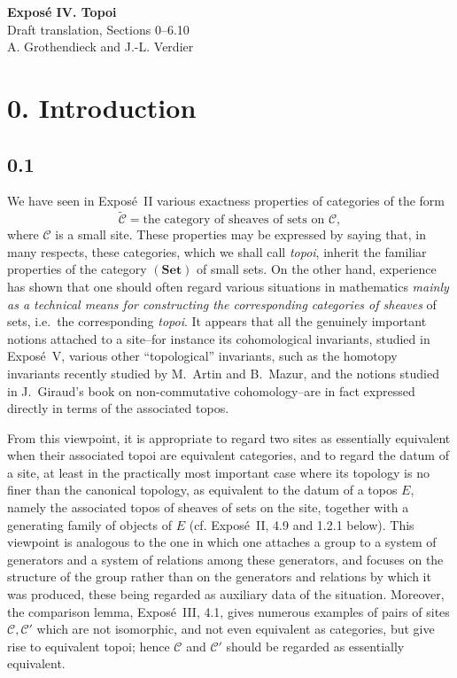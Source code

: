 \documentclass[11pt]{article}
\newcommand{\C}{\mathcal{C}}
\newcommand{\Set}{\mathbf{Set}}
\newcommand{\ie}{i.e.}
\begin{document}
\begin{center}
{\Large \textbf{Expos\'e IV. Topoi}}\\[0.35em]
{\large Draft translation, Sections 0--6.10}\\[0.35em]
A. Grothendieck and J.-L. Verdier
\end{center}

\bigskip


\section*{0. Introduction}

\subsection*{0.1}
We have seen in Expos\'e~II various exactness properties of categories of the form
\[
\widetilde{\C}=\text{the category of sheaves of sets on }\C,
\]
where \(\C\) is a small site. These properties may be expressed by saying that, in many respects, these categories, which we shall call \emph{topoi}, inherit the familiar properties of the category \((\Set)\) of small sets. On the other hand, experience has shown that one should often regard various situations in mathematics \emph{mainly as a technical means for constructing the corresponding categories of sheaves} of sets, \ie\ the corresponding \emph{topoi}. It appears that all the genuinely important notions attached to a site--for instance its cohomological invariants, studied in Expos\'e~V, various other ``topological'' invariants, such as the homotopy invariants recently studied by M.~Artin and B.~Mazur, and the notions studied in J.~Giraud's book on non-commutative cohomology--are in fact expressed directly in terms of the associated topos.

From this viewpoint, it is appropriate to regard two sites as essentially equivalent when their associated topoi are equivalent categories, and to regard the datum of a site, at least in the practically most important case where its topology is no finer than the canonical topology, as equivalent to the datum of a topos \(E\), namely the associated topos of sheaves of sets on the site, together with a generating family of objects of \(E\) (cf. Expos\'e~II, 4.9 and 1.2.1 below). This viewpoint is analogous to the one in which one attaches a group to a system of generators and a system of relations among these generators, and focuses on the structure of the group rather than on the generators and relations by which it was produced, these being regarded as auxiliary data of the situation. Moreover, the comparison lemma, Expos\'e~III, 4.1, gives numerous examples of pairs of sites \(\C,\C'\) which are not isomorphic, and not even equivalent as categories, but give rise to equivalent topoi; hence \(\C\) and \(\C'\) should be regarded as essentially equivalent.
\end{document}
